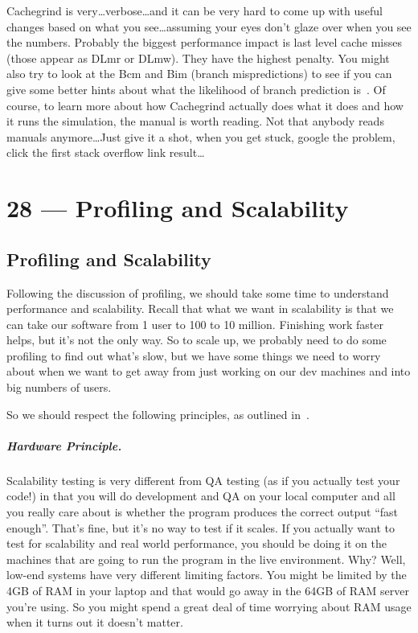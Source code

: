 \documentclass[a4paper]{report}
\begin{document}
Cachegrind is very\ldots verbose\ldots and it can be very hard to come up with useful changes based on what you see\ldots assuming your eyes don't glaze over when you see the numbers. Probably the biggest performance impact is last level cache misses (those appear as DLmr or DLmw). They have the highest penalty. You might also try to look at the Bcm and Bim (branch mispredictions) to see if you can give some better hints about what the likelihood of branch prediction is~\cite{cachegrind}. Of course, to learn more about how Cachegrind actually does what it does and how it runs the simulation, the manual is worth reading. Not that anybody reads manuals anymore\ldots Just give it a shot, when you get stuck, google the problem, click the first stack overflow link result\ldots










\chapter*{28 --- Profiling and Scalability}


\section*{Profiling and Scalability}

Following the discussion of profiling, we should take some time to understand performance and scalability. Recall that what we want in scalability is that we can take our software from 1 user to 100 to 10 million. Finishing work faster helps, but it's not the only way. So to scale up, we probably need to do some profiling to find out what's slow, but we have some things we need to worry about when we want to get away from just working on our dev machines and into big numbers of users.

So we should respect the following principles, as outlined in~\cite{swps}.

\paragraph{Hardware Principle.} 
Scalability testing is very different from  QA testing (as if you actually test your code!) in that you will do development and QA on your local computer and all you really care about is whether the program produces the correct output ``fast enough''. That's fine, but it's no way to test if it scales. If you actually want to test for scalability and real world performance, you should be doing it on the machines that are going to run the program in the live environment. Why? Well, low-end systems have very different limiting factors. You might be limited by the 4GB of RAM in your laptop and that would go away in the 64GB of RAM server you're using. So you might spend a great deal of time worrying about RAM usage when it turns out it doesn't matter.
\end{document}
